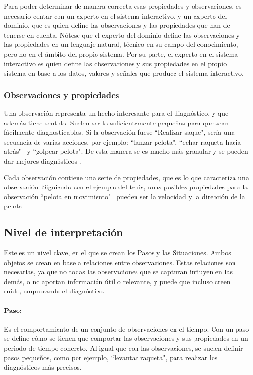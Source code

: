 Para poder determinar de manera correcta esas propiedades y observaciones, es necesario contar con un 
experto en el sistema interactivo, y un experto del dominio, que es quien define las observaciones y las
propiedades que han de tenerse en cuenta. N\'otese que el experto del dominio define las observaciones y las
propiedades en un lenguaje natural, t\'ecnico en su campo del conocimiento, pero no en el \'ambito del propio
sistema. Por su parte, el experto en el sistema interactivo es quien define
las observaciones y sus propiedades en el propio sistema
en base a los datos, valores y se\~nales que produce el sistema interactivo.

\subsubsection{Observaciones y propiedades}
Una observaci\'on representa un hecho interesante para el diagn\'ostico, y que 
adem\'as tiene sentido. Suelen
ser lo suficientemente peque\~nas para que sean f\'acilmente diagnosticables. Si la observaci\'on
fuese ``Realizar saque", ser\'ia una secuencia de varias acciones, por ejemplo: ``lanzar pelota", ``echar raqueta hacia atr\'as" \
y ``golpear pelota". De esta manera se es mucho m\'as granular y se pueden dar mejores diagn\'osticos \cite{INTRASIM:Manual}.

Cada observaci\'on contiene una serie de propiedades, que es lo que caracteriza una observaci\'on. 
Siguiendo con el ejemplo del tenis, unas posibles propiedades para la observaci\'on ``pelota en movimiento" \
pueden ser la velocidad y la direcci\'on de la pelota.

\subsection{Nivel de interpretaci\'on}
Este es un nivel clave, en el que se crean los Pasos y las Situaciones. Ambos objetos se crean en base a relaciones
entre observaciones.
Estas relaciones son necesarias, ya que no todas las observaciones que se capturan influyen en las dem\'as,
o no aportan informaci\'on \'util o relevante, y puede que incluso creen ruido, empeorando el diagn\'ostico.

\paragraph{\textbf{Paso:}}
Es el comportamiento de un conjunto de observaciones en el tiempo. Con un paso se define 
c\'omo se tienen
que comportar las observaciones y sus propiedades en un periodo de tiempo concreto. Al igual que con las observaciones,
se suelen definir pasos peque\~nos, como por ejemplo, ``levantar raqueta", para realizar los diagn\'osticos m\'as precisos.

